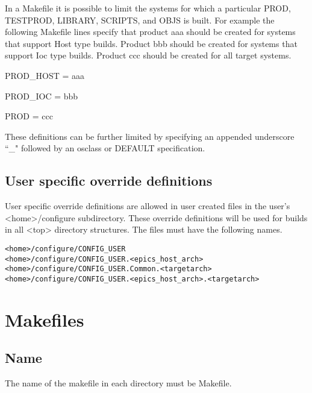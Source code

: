 In a Makefile it is possible to limit the systems for which a particular PROD, TESTPROD, LIBRARY, SCRIPTS, and 
OBJS is built. For example the following Makefile lines specify that product aaa should be created for systems that 
support Host type builds. Product bbb should be created for systems that support Ioc type builds. Product ccc should be 
created for all target systems.

\begin{description}\item PROD\_HOST = aaa

\item PROD\_IOC = bbb

\item PROD = ccc

\end{description}These definitions can be further limited by specifying an appended underscore ``\_" followed by an osclass or DEFAULT 
specification.

\subsection{User specific override definitions}

User specific override definitions are allowed in user created files in the user's \textless{}home\textgreater{}/configure subdirectory. These 
override definitions will be used for builds in all \textless{}top\textgreater{} directory structures. The files must have the following names. 

\begin{verbatim}
<home>/configure/CONFIG_USER
<home>/configure/CONFIG_USER.<epics_host_arch>
<home>/configure/CONFIG_USER.Common.<targetarch>
<home>/configure/CONFIG_USER.<epics_host_arch>.<targetarch>
\end{verbatim}

\section{Makefiles}

\subsection{Name}

The name of the makefile in each directory must be Makefile.

